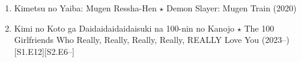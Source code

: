 \documentclass{article}
\begin{document}
\begin{enumerate}
    {\sf Akaza.}
    \begin{itemize}
    	\item {\it``I hate weak people. Weak people $\ldots$ never fight face to face. \& poison well. Despicable. Weak people $\ldots$ They lack patience. They will quickly reap what they sow. I killed people with these `protecting fists'. I blooded my master's previous Soryuu style. I couldn't respect my father's last words. That's right. That's who I wanted to kill.''} -- {\sf Akaza}, before committing suicide, Chap. 155.
    \end{itemize}
    \item {\sc Kimetsu no Yaiba: Mugen Ressha-Hen $\star$ Demon Slayer: Mugen Train} (2020)
    \item {\sc Kimi no Koto ga Daidaidaidaidaisuki na 100-nin no Kanojo $\star$ The 100 Girlfriends Who Really, Really, Really, Really, REALLY Love You} (2023--)\hfill[S1.E12][S2.E6--]
    

\end{enumerate}
\end{document}
